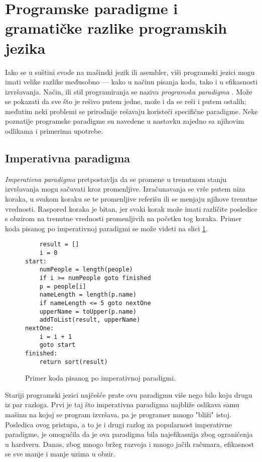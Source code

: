 \section{Programske paradigme i gramatičke razlike programskih jezika}
\label{sec:Paradigms}

Iako se u suštini svode na mašinski jezik ili asembler, viši programski jezici mogu imati velike razlike međusobno --- kako u načinu pisanja koda, tako i u efikasnosti izvršavanja. Način, ili stil programiranja se naziva \emph{programska paradigma} \cite{ProgrammingParadigms}. Može se pokazati da sve što je rešivo putem jedne, može i da se reši i putem ostalih; međutim neki problemi se prirodnije rešavaju koristeći specifične paradigme. Neke poznatije programske paradigme su navedene u nastavku zajedno sa njihovim odlikama i primerima upotrebe.

\subsection{Imperativna paradigma}
\label{subsec:ParadigmImperative}

\emph{Imperativna paradigma} pretpostavlja da se promene u trenutnom stanju izvršavanja mogu sačuvati kroz promenljive. Izračunavanja se vrše putem niza koraka, u svakom koraku se te promenljive referišu ili se menjaju njihove trenutne vrednosti. Raspored koraka je bitan, jer svaki korak može imati različite posledice s obzirom na trenutne vrednosti promenljivih na početku tog koraka. Primer koda pisanog po imperativnoj paradigmi se može videti na slici \ref{fig:ParadigmImperative}.

\begin{figure}[h!]
\begin{lstlisting}
    result = []
    i = 0
start:
    numPeople = length(people)
    if i >= numPeople goto finished
    p = people[i]
    nameLength = length(p.name)
    if nameLength <= 5 goto nextOne
    upperName = toUpper(p.name)
    addToList(result, upperName)
nextOne:
    i = i + 1
    goto start
finished:
    return sort(result)
\end{lstlisting}
\caption{Primer koda pisanog po imperativnoj paradigmi.}
\label{fig:ParadigmImperative}
\end{figure}

Stariji programski jezici najčešće prate ovu paradigmu više nego bilo koju drugu iz par razloga. Prvi je taj što imperativna paradigma najbliže oslikava samu mašinu na kojoj se program izvršava, pa je programer mnogo "bliži" istoj. Posledica ovog pristupa, a to je i drugi razlog za popularnost imperativne paradigme, je omogućila da je ova paradigma bila najefikasnija zbog ograničenja u hardveru. Danas, zbog mnogo bržeg razvoja i mnogo jačih računara, efikasnost se sve manje i manje uzima u obzir.

